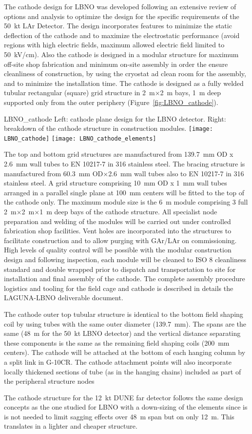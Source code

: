 The cathode design for LBNO was developed following an extensive
review of options and analysis to optimize the design for the specific
requirements of the 50~kt LAr Detector.  The design incorporates
features to minimize the static deflection of the cathode and to
maximize the electrostatic performance (avoid regions with high
electric fields, maximum allowed electric field limited to 50~kV/cm). 
Also the cathode is designed in a modular structure for
maximum off-site shop fabrication and minimum on-site assembly in
order the ensure cleanliness of construction, by using the cryostat ad
clean room for the assembly, and to minimize the installation
time. The cathode is designed as a fully welded tubular rectangular
(square) grid structure in 2~m$\times$2~m bays, 1~m deep supported only from
the outer periphery (Figure~\ref{fig:LBNO_cathode}).  
\begin{cdrfigure}{LBNO_cathode}
{\small Left: cathode plane design for the LBNO detector. Right: breakdown of 
the cathode structure in construction modules.}
\texttt{[image: LBNO\_cathode]} \hfil
\texttt{[image: LBNO\_cathode\_elements]}
\end{cdrfigure}
The top and bottom grid structures are manufactured from 139.7~mm OD x
2.6~mm wall tubes to EN 10217-7 in 316 stainless steel.  The bracing
structure is manufactured from 60.3~mm OD$\times$2.6~mm wall tubes also to EN
10217-7 in 316 stainless steel.  A grid structure comprising 10~mm OD x
1~mm wall tubes arranged in a parallel single plane at 100~mm centers
will be fitted to the top of the cathode only. The maximum module size
is the 6~m module comprising 3 full 2~m$\times$2~m$\times$1~m deep bays
of the cathode structure.  All specialist node preparation and welding
of the modules will be carried out under controlled fabrication shop
facilities.  Vent holes are incorporated into the structures to
facilitate construction and to allow purging with GAr/LAr on
commissioning. High levels of quality control will be possible with
the modular construction design and following inspection, each module
will be cleaned to ISO 8 cleanliness standard and double wrapped prior
to dispatch and transportation to site for installation and final
assembly of the cathode. The complete assembly procedure logistics and
tooling for the field cage and cathode is described in details the
LAGUNA-LBNO deliverable document.

The cathode outer top tubular structure is identical to the bottom
field shaping coil by using tubes with the same outer diameter
(139.7~mm).  The spans are the same (48~m for the 50~kt LBNO detector)
and the vertical distance separating these components is the same as
the remaining field shaping coils (200~mm centers). The cathode will be
attached at the bottom of each hanging column by a split link in
G-10CR. The cathode attachment points will also incorporate locally
thickened sections of tube (as in the hanging chains) included as part
of the peripheral structure nodes


The cathode structure for the 12~kt DUNE far detector follows the
same design concepts as the one studied for LBNO with a down-sizing of
the elements since is is not needed to limit sagging effects over 48~m
span but on only 12~m. This translates in a lighter and cheaper
structure.
